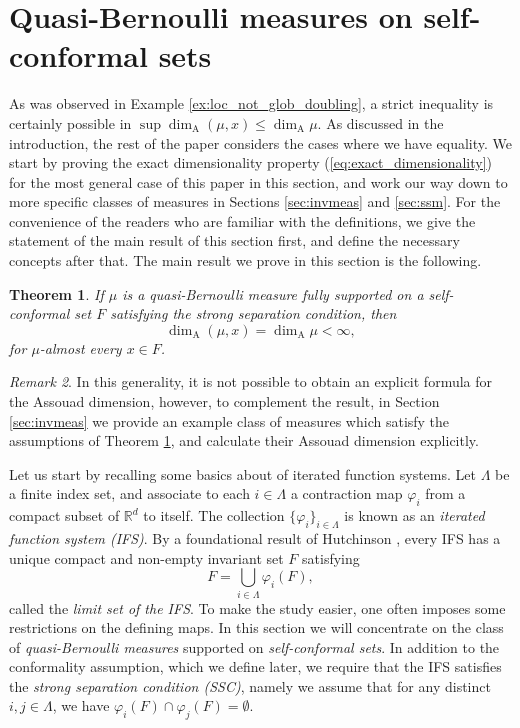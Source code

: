 \documentclass{PRM}
\newcommand{\field}[1]{\mathbb{#1}}
\newcommand{\R}{\field{R}}
\newcommand{\adim}{\dim_{\mathrm{A}}}
\theoremstyle{plain}
\newtheorem{thm}{Theorem}[section]
\theoremstyle{definition}
\theoremstyle{remark}
\newtheorem{huom}[thm]{Remark}
\begin{document}
\section{Quasi-Bernoulli measures on self-conformal sets}\label{sec:qb-meas}
As was observed in Example \ref{ex:loc_not_glob_doubling}, a strict inequality is certainly possible in $\sup\adim(\mu,x)\leq \adim\mu$. As discussed in the introduction, the rest of the paper considers the cases where we have equality. We start by proving the exact dimensionality property (\ref{eq:exact_dimensionality}) for the most general case of this paper in this section, and work our way down to more specific classes of measures in Sections \ref{sec:invmeas} and \ref{sec:ssm}. For the convenience of the readers who are familiar with the definitions, we give the statement of the main result of this section first, and define the necessary concepts after that. The main result we prove in this section is the following.

\begin{thm}\label{thm:quasi-bernoulli-exact-assouad}
    If $\mu$ is a quasi-Bernoulli measure fully supported on a self-conformal set $F$ satisfying the strong separation condition, then
    \begin{equation*}
        \dim_{\mathrm{A}}(\mu,x)=\dim_{\mathrm{A}}\mu<\infty,
    \end{equation*}
    for $\mu$-almost every $x\in F$.
\end{thm}
\begin{huom}
    In this generality, it is not possible to obtain an explicit formula for the Assouad dimension, however, to complement the result, in Section \ref{sec:invmeas} we provide an example class of measures which satisfy the assumptions of Theorem \ref{thm:quasi-bernoulli-exact-assouad}, and calculate their Assouad dimension explicitly.
\end{huom}

Let us start by recalling some basics about of iterated function systems. Let $\Lambda$ be a finite index set, and associate to each $i\in\Lambda$ a contraction map $\varphi_i$ from a compact subset of $\R^d$ to itself. The collection $\{\varphi_i\}_{i\in\Lambda}$ is known as an \emph{iterated function system (IFS)}. By a foundational result of Hutchinson \cite{H}, every IFS has a unique compact and non-empty invariant set $F$ satisfying
\begin{equation*}
    F=\bigcup_{i\in\Lambda}\varphi_i(F),
\end{equation*}
called the \emph{limit set of the IFS}. To make the study easier, one often imposes some restrictions on the defining maps. In this section we will concentrate on the class of \emph{quasi-Bernoulli measures} supported on \emph{self-conformal sets}. In addition to the conformality assumption, which we define later, we require that the IFS satisfies the \emph{strong separation condition (SSC)}, namely we assume that for any distinct $i,j\in\Lambda$, we have $\varphi_i(F)\cap \varphi_j(F)=\emptyset$.
\end{document}
